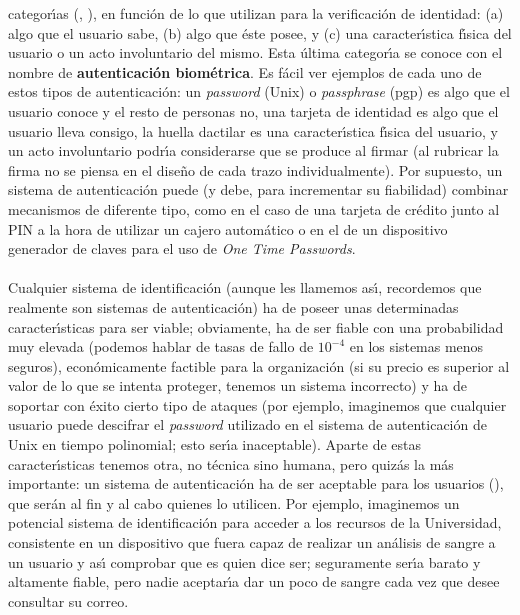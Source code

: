 categor\'{\i}as (\cite{kn:dav84}, \cite{kn:eve92}), en funci\'on de lo que 
utilizan para la verificaci\'on de identidad: (a) algo que el usuario sabe, 
(b) algo que \'este posee, y (c) una caracter\'{\i}stica f\'{\i}sica 
del usuario o un acto involuntario del mismo. Esta \'ultima categor\'{\i}a se
conoce con el nombre de {\bf autenticaci\'on biom\'etrica}. Es f\'acil ver 
ejemplos de cada uno de estos tipos de autenticaci\'on: 
un {\it password} (Unix) o {\it passphrase} ({\sc pgp}) es algo que el usuario 
conoce 
y el resto de personas no, una tarjeta de identidad es algo que el usuario lleva
consigo, la huella dactilar es una caracter\'{\i}stica f\'{\i}sica del usuario, 
y un acto involuntario podr\'{\i}a considerarse que se produce al firmar (al 
rubricar la firma no se piensa en el dise\~no de cada trazo individualmente). 
Por supuesto, un sistema de autenticaci\'on puede (y debe, para incrementar su 
fiabilidad) combinar mecanismos de diferente tipo, como en el caso de una 
tarjeta de cr\'edito junto al PIN a la hora de utilizar un cajero autom\'atico 
o en el de un dispositivo generador de claves para el uso de {\it One Time 
Passwords}.\\
\\Cualquier sistema de identificaci\'on (aunque les llamemos as\'{\i}, 
recordemos
que realmente son sistemas de autenticaci\'on) ha de poseer unas determinadas
caracter\'{\i}sticas para ser viable; obviamente, ha de ser fiable con una 
probabilidad muy elevada (podemos hablar de tasas de fallo de $10^{-4}$ en los
sistemas menos seguros), econ\'omicamente factible para la organizaci\'on (si
su precio es superior al valor de lo que se intenta proteger, tenemos un sistema
incorrecto) y ha de soportar con \'exito cierto tipo de ataques (por ejemplo,
imaginemos que cualquier usuario puede descifrar el {\it password} utilizado en
el sistema de autenticaci\'on de Unix en tiempo polinomial; esto ser\'{\i}a
inaceptable). Aparte de estas caracter\'{\i}sticas tenemos otra, no t\'ecnica 
sino humana, pero quiz\'as la m\'as importante: un sistema de autenticaci\'on ha
de ser aceptable para los usuarios (\cite{kn:tan91}), que ser\'an al fin y al 
cabo quienes lo utilicen. Por ejemplo, imaginemos un potencial sistema de 
identificaci\'on para acceder a los recursos de la Universidad, consistente en 
un dispositivo que fuera capaz de realizar un an\'alisis de sangre a un usuario 
y as\'{\i} comprobar que es quien dice ser; seguramente ser\'{\i}a barato y
altamente fiable, pero nadie aceptar\'{\i}a dar un poco de sangre cada vez que
desee consultar su correo.
